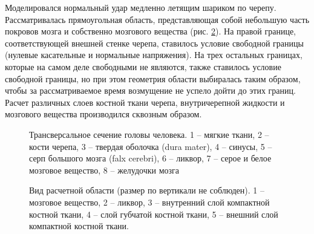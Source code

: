 Моделировался нормальный удар медленно летящим шариком по черепу. Рассматривалась прямоугольная область, представляющая собой небольшую часть покровов мозга и собственно мозгового вещества (рис. \ref{pic:cranium_calc_model}). На правой границе, соответствующей внешней стенке черепа, ставилось условие свободной границы (нулевые касательные и нормальные напряжения). На трех остальных границах, которые на самом деле свободными не являются, также ставилось условие свободной границы, но при этом геометрия области выбиралась таким образом, чтобы за рассматриваемое время возмущение не успело дойти до этих границ. Расчет различных слоев костной ткани черепа, внутричерепной жидкости и мозгового вещества производился сквозным образом.

\begin{figure}[h]
\caption{Трансверсальное сечение головы человека. 1 -- мягкие ткани, 2 -- кости черепа, 3 -- твердая оболочка (dura mater), 4 -- синусы, 5 -- серп большого мозга (falx cerebri), 6 -- ликвор, 7 -- серое и белое мозговое вещество, 8 -- желудочки мозга}
\label{pic:cranium_section}
\end{figure}

\begin{figure}[h]
\caption{Вид расчетной области (размер по вертикали не соблюден). 1 -- мозговое вещество, 2 -- ликвор, 3 -- внутренний слой компактной костной ткани, 4 -- слой губчатой костной ткани, 5 -- внешний слой компактной костной ткани.}
\label{pic:cranium_calc_model}
\end{figure}

